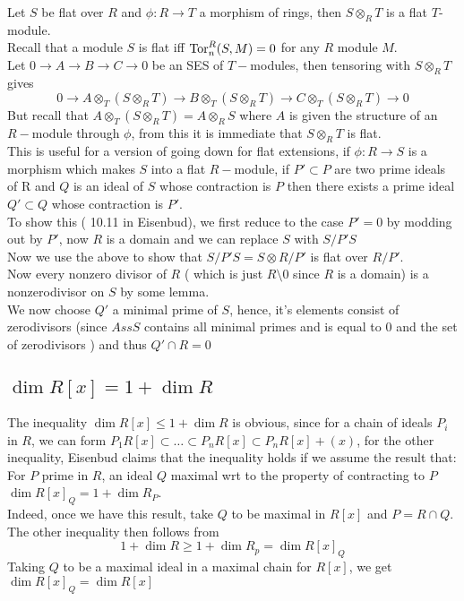 \documentclass[../main.tex]{subfiles}
\begin{document}
Let $S$  be flat over $R$ and $\phi: R\to T$ a morphism of rings, then $S\otimes_R T$ is a flat $T$-module.\\
Recall that a module $S$ is flat iff $\operatorname{Tor} _n^{R}( S,M) =0$ for any $R$ module $M$.\\
Let $0 \to A \to B \to C \to 0 $ be an SES of $T-$modules, then tensoring with $S\otimes_R T$ gives
\[ 
0 \to A\otimes_T ( S\otimes_R T) \to B \otimes_T ( S\otimes_R T) \to C \otimes_T ( S\otimes_R T) \to 0
\]
But recall that $A\otimes_T ( S\otimes_R T) = A \otimes_R S$ where $A$ is given the structure of an $R-$module through $\phi$, from this it is immediate that $S\otimes_R T$ is flat.\\

This is useful for a version of going down for flat extensions, if $\phi:R \to S$ is a morphism which makes $S$ into a flat $R-$module, if $P' \subset P$ are two prime ideals of R and $Q$ is an ideal of $S$ whose contraction is $P$ then there exists a prime ideal $Q' \subset Q$ whose contraction is $P'$.\\

To show this ( 10.11 in Eisenbud), we first reduce to the case $P'=0$ by modding out by $P'$, now $R$ is a domain and we can replace $S$ with $S/P'S$ \\
Now we use the above to show that $S /P'S = S \otimes R /P' $ is flat over $R /P'$.\\
Now every nonzero divisor of $R$ ( which is just $R\setminus 0$ since $R$  is a domain) is a nonzerodivisor on $S$ by some lemma.\\
We now choose $Q'$ a minimal prime of $S$, hence, it's elements  consist of zerodivisors (since $Ass S$ contains all minimal primes and is equal to 0 and the set of zerodivisors ) and thus $Q' \cap R = 0$ 

\subsection*{$\dim R[x] = 1 + \dim R$ }

The inequality $\dim R[x] \leq 1 + \dim R$ is obvious, since for a chain of ideals $P_i$ in $R$, we can form $P_1R[x] \subset \ldots \subset P_n R[x] \subset P_n R[x] + ( x)  $, for the other inequality, Eisenbud claims that the inequality holds if we assume the result that:\\
For $P$ prime in $R$, an ideal $Q$ maximal wrt to the property of contracting to $P$
$\dim R[x]_Q = 1 + \dim R_P$.\\

Indeed, once we have this result, take $Q$ to be maximal in $R[x]$ and $P= R\cap Q$.\\
The other inequality then follows from
\[ 
1+ \dim R \geq 1 + \dim R_p = \dim R[x]_Q
\]
Taking $Q$ to be a maximal ideal in a maximal chain for $R[x]$, we get $\dim R[x]_Q = \dim R[x]$ 
\end{document}

